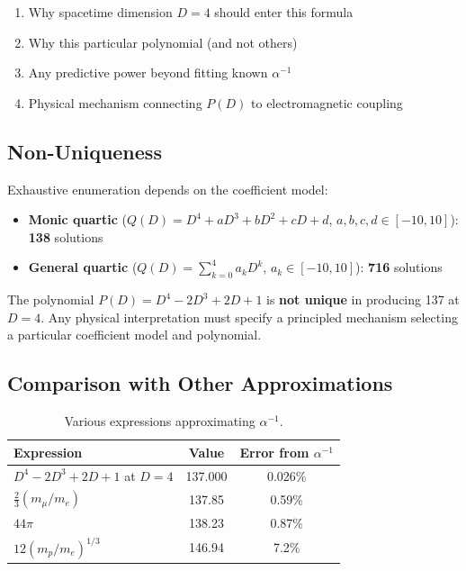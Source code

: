 \documentclass[11pt,a4paper]{article}
\begin{document}
\begin{enumerate}
    \item Why spacetime dimension $D=4$ should enter this formula
    \item Why this particular polynomial (and not others)
    \item Any predictive power beyond fitting known $\alpha^{-1}$
    \item Physical mechanism connecting $P(D)$ to electromagnetic coupling
\end{enumerate}

\subsection{Non-Uniqueness}

Exhaustive enumeration depends on the coefficient model:

\begin{itemize}
    \item \textbf{Monic quartic} ($Q(D) = D^4 + aD^3 + bD^2 + cD + d$, $a,b,c,d \in [-10,10]$): \textbf{138} solutions
    \item \textbf{General quartic} ($Q(D) = \sum_{k=0}^4 a_k D^k$, $a_k \in [-10,10]$): \textbf{716} solutions
\end{itemize}

The polynomial $P(D) = D^4 - 2D^3 + 2D + 1$ is \textbf{not unique} in producing 137 at $D = 4$. Any physical interpretation must specify a principled mechanism selecting a particular coefficient model and polynomial.

\subsection{Comparison with Other Approximations}

\begin{table}[h]
\centering
\begin{tabular}{|l|c|c|}
\hline
Expression & Value & Error from $\alpha^{-1}$ \\
\hline
$D^4 - 2D^3 + 2D + 1$ at $D=4$ & 137.000 & 0.026\% \\
$\frac{2}{3}(m_\mu/m_e)$ & 137.85 & 0.59\% \\
$44\pi$ & 138.23 & 0.87\% \\
$12 (m_p/m_e)^{1/3}$ & 146.94 & 7.2\% \\
\hline
\end{tabular}
\caption{Various expressions approximating $\alpha^{-1}$.}
\end{table}
\end{document}
